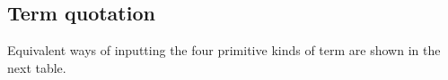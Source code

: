 

\subsection{Term quotation}

Equivalent ways of inputting the four primitive kinds of term are shown in
the next table.

\bigskip

